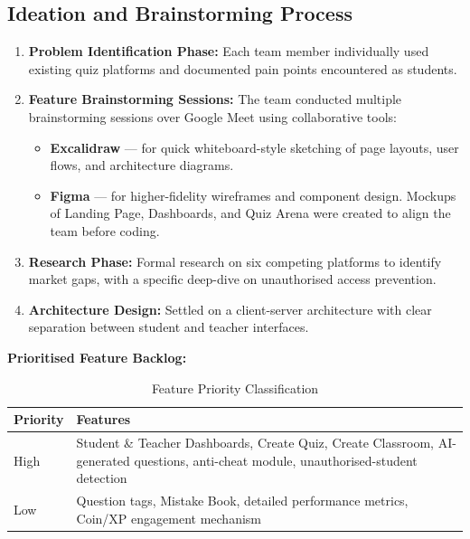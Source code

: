\documentclass[12pt,a4paper]{article}
\begin{document}
\subsection{Ideation and Brainstorming Process}

\begin{enumerate}[leftmargin=1.5em]
  \item \textbf{Problem Identification Phase:} Each team member individually
        used existing quiz platforms and documented pain points encountered as
        students.

  \item \textbf{Feature Brainstorming Sessions:} The team conducted multiple
        brainstorming sessions over Google Meet using collaborative tools:
        \begin{itemize}
          \item \textbf{Excalidraw} --- for quick whiteboard-style sketching of
                page layouts, user flows, and architecture diagrams.
          \item \textbf{Figma} --- for higher-fidelity wireframes and component
                design. Mockups of Landing Page, Dashboards, and Quiz Arena
                were created to align the team before coding.
        \end{itemize}

  \item \textbf{Research Phase:} Formal research on six competing platforms to
        identify market gaps, with a specific deep-dive on unauthorised access
        prevention.

  \item \textbf{Architecture Design:} Settled on a client-server architecture
        with clear separation between student and teacher interfaces.
\end{enumerate}

\textbf{Prioritised Feature Backlog:}

\begin{table}[H]
  \centering
  \caption{Feature Priority Classification}
  \small
  \begin{tabularx}{\linewidth}{@{} l X @{}}
    \toprule
    \textbf{Priority} & \textbf{Features} \\
    \midrule
    High & Student \& Teacher Dashboards, Create Quiz, Create Classroom, AI-generated questions, anti-cheat module, unauthorised-student detection \\
    Low  & Question tags, Mistake Book, detailed performance metrics, Coin/XP engagement mechanism \\
    \bottomrule
  \end{tabularx}
\end{table}
\end{document}
